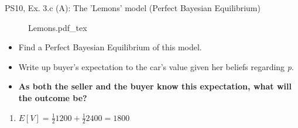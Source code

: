 \begin{frame}{PS10, Ex. 3.c (A): The 'Lemons' model (Perfect Bayesian Equilibrium)}
    \begin{figure}[!h]
      \center {}
      {Lemons.pdf_tex}
    \end{figure}
    \vspace{-8pt}
    \begin{itemize}
      \item[(c)] Find a Perfect Bayesian Equilibrium of this model.
    \end{itemize}
    \vspace{-8pt}
    \begin{multicols}{2}
      \begin{itemize}
        \item[Step 1:] Write up buyer's expectation to the car's value given her beliefs regarding \textit{p}.
        \item[Step 2:] \textbf{As both the seller and the buyer know this expectation, what will the outcome be?}
      \end{itemize}
      \vfill\null\columnbreak
      \begin{enumerate}
        \item $E[V]=\frac{1}{2}1200+\frac{1}{2}2400=1800$
      \end{enumerate}
      \vfill\null
    \end{multicols}
\end{frame}
